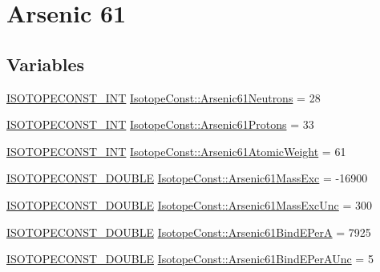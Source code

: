 \hypertarget{group___isotope_const-_arsenic-_as61}{}\section{Arsenic 61}
\label{group___isotope_const-_arsenic-_as61}
\subsection*{Variables}
\begin{DoxyCompactItemize}
\item 
\mbox{\hyperlink{group___isotope_const-_macros_ga5f18360b3e99483a35c32d789e62621c}{I\+S\+O\+T\+O\+P\+E\+C\+O\+N\+S\+T\+\_\+\+I\+NT}} \mbox{\hyperlink{group___isotope_const-_arsenic-_as61_gae851a5805b11c7f25dab586c681d9c60}{Isotope\+Const\+::\+Arsenic61\+Neutrons}} = 28
\item 
\mbox{\hyperlink{group___isotope_const-_macros_ga5f18360b3e99483a35c32d789e62621c}{I\+S\+O\+T\+O\+P\+E\+C\+O\+N\+S\+T\+\_\+\+I\+NT}} \mbox{\hyperlink{group___isotope_const-_arsenic-_as61_ga57a5de2c025c5afc08134b93a53390a3}{Isotope\+Const\+::\+Arsenic61\+Protons}} = 33
\item 
\mbox{\hyperlink{group___isotope_const-_macros_ga5f18360b3e99483a35c32d789e62621c}{I\+S\+O\+T\+O\+P\+E\+C\+O\+N\+S\+T\+\_\+\+I\+NT}} \mbox{\hyperlink{group___isotope_const-_arsenic-_as61_ga7b50f91c662995061f94e31ae10f252b}{Isotope\+Const\+::\+Arsenic61\+Atomic\+Weight}} = 61
\item 
\mbox{\hyperlink{group___isotope_const-_macros_ga8f45a7272ce02c0b4c65c44636ed719a}{I\+S\+O\+T\+O\+P\+E\+C\+O\+N\+S\+T\+\_\+\+D\+O\+U\+B\+LE}} \mbox{\hyperlink{group___isotope_const-_arsenic-_as61_gaa9b2eea806994a8a41e77c86fbc82c6b}{Isotope\+Const\+::\+Arsenic61\+Mass\+Exc}} = -\/16900
\item 
\mbox{\hyperlink{group___isotope_const-_macros_ga8f45a7272ce02c0b4c65c44636ed719a}{I\+S\+O\+T\+O\+P\+E\+C\+O\+N\+S\+T\+\_\+\+D\+O\+U\+B\+LE}} \mbox{\hyperlink{group___isotope_const-_arsenic-_as61_gae1184b52e6af30024dee0fb7818397f0}{Isotope\+Const\+::\+Arsenic61\+Mass\+Exc\+Unc}} = 300
\item 
\mbox{\hyperlink{group___isotope_const-_macros_ga8f45a7272ce02c0b4c65c44636ed719a}{I\+S\+O\+T\+O\+P\+E\+C\+O\+N\+S\+T\+\_\+\+D\+O\+U\+B\+LE}} \mbox{\hyperlink{group___isotope_const-_arsenic-_as61_ga25b67f39558ebf83edc7e64022c7b0fc}{Isotope\+Const\+::\+Arsenic61\+Bind\+E\+PerA}} = 7925
\item 
\mbox{\hyperlink{group___isotope_const-_macros_ga8f45a7272ce02c0b4c65c44636ed719a}{I\+S\+O\+T\+O\+P\+E\+C\+O\+N\+S\+T\+\_\+\+D\+O\+U\+B\+LE}} \mbox{\hyperlink{group___isotope_const-_arsenic-_as61_ga50b917b42e21139ddbbfe146dde6beb5}{Isotope\+Const\+::\+Arsenic61\+Bind\+E\+Per\+A\+Unc}} = 5

\end{DoxyCompactItemize}
